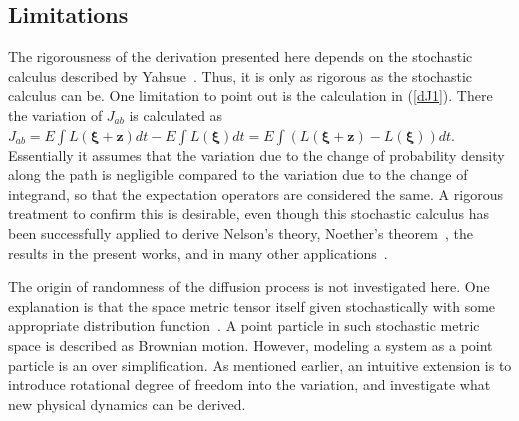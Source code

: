 \documentclass[%
 aip, 
 amsmath,amssymb,amsthm,
 nofootinbib,
 reprint,
]{revtex4-1}
\begin{document}
\subsection{Limitations}
The rigorousness of the derivation presented here depends on the stochastic calculus described by Yahsue~\cite{Yasue}. Thus, it is only as rigorous as the stochastic calculus can be. One limitation to point out is the calculation in (\ref{dJ1}). There the variation of $J_{ab}$ is calculated as $J_{ab}=E\int L(\mathbf{\xi}+\mathbf{z})dt - E\int L(\mathbf{\xi})dt = E\int (L(\mathbf{\xi}+\mathbf{z})-L(\mathbf{\xi}))dt $. Essentially it assumes that the variation due to the change of probability density along the path is negligible compared to the variation due to the change of integrand, so that the expectation operators are considered the same. A rigorous treatment to confirm this is desirable, even though this stochastic calculus has been successfully applied to derive Nelson's theory, Noether's theorem~\cite{Yasue}, the results in the present works, and in many other applications~\cite{Zambrini, Zambrini2, Cresson}. 

The origin of randomness of the diffusion process is not investigated here. One explanation is that the space metric tensor itself given stochastically with some appropriate distribution function~\cite{Kurihara}. A point particle in such stochastic metric space is described as Brownian motion. However, modeling a system as a point particle is an over simplification. As mentioned earlier, an intuitive extension is to introduce rotational degree of freedom into the variation, and investigate what new physical dynamics can be derived. 
\end{document}
